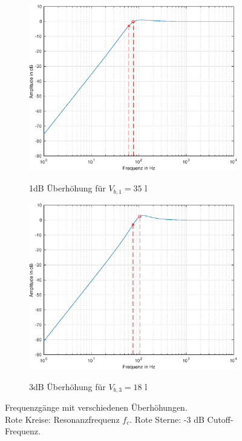 \begin{figure}[H]
    \centering
    
    \begin{subfigure}{.49\textwidth}
        \centering
        \caption{1dB Überhöhung für $V_{b,1} = 35$ l}
        \includegraphics[width=0.85\linewidth]{Figures/Frequenzgang_1dB.eps}
        \label{Frequenzgang_1dB}
    \end{subfigure}
    \begin{subfigure}{.49\textwidth}
        \centering
        \caption{3dB Überhöhung für $V_{b,3} = 18$ l}
        \includegraphics[width=0.85\linewidth]{Figures/Frequenzgang_3dB.eps}
        \label{Frequenzgang_3dB}
    \end{subfigure}
    \captionsetup{justification=centering}
    \caption{Frequenzgänge mit verschiedenen Überhöhungen.\\Rote Kreise: Resonanzfrequenz $f_c$. Rote Sterne: -3 dB Cutoff-Frequenz.}
    \label{fig:Ueberhoehung}
\end{figure}

